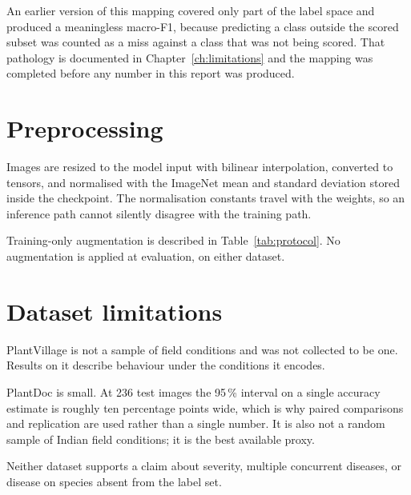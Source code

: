 An earlier version of this mapping covered only part of the label space and produced
a meaningless macro-F1, because predicting a class outside the scored subset was
counted as a miss against a class that was not being scored. That pathology is
documented in Chapter~\ref{ch:limitations} and the mapping was completed before any
number in this report was produced.

\section{Preprocessing}

Images are resized to the model input with bilinear interpolation, converted to
tensors, and normalised with the ImageNet mean and standard deviation stored inside
the checkpoint. The normalisation constants travel with the weights, so an inference
path cannot silently disagree with the training path.

Training-only augmentation is described in Table~\ref{tab:protocol}. No augmentation
is applied at evaluation, on either dataset.

\section{Dataset limitations}

PlantVillage is not a sample of field conditions and was not collected to be one.
Results on it describe behaviour under the conditions it encodes.

PlantDoc is small. At 236 test images the 95\,\% interval on a single accuracy
estimate is roughly ten percentage points wide, which is why paired comparisons and
replication are used rather than a single number. It is also not a random sample of
Indian field conditions; it is the best available proxy.

Neither dataset supports a claim about severity, multiple concurrent diseases, or
disease on species absent from the label set.
